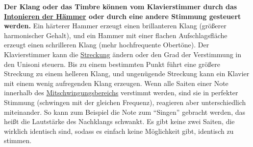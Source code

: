 \textbf{Der Klang oder das Timbre können vom Klavierstimmer durch das \hyperref[c2_7_hamm]{Intonieren der Hämmer} oder durch eine andere Stimmung gesteuert werden.}
Ein härterer Hammer erzeugt einen brillanteren Klang (größerer harmonischer Gehalt), und ein Hammer mit einer flachen  Aufschlagsfläche erzeugt einen schrilleren Klang (mehr hochfrequente Obertöne).
Der Klavierstimmer kann die \hyperref[c2_5_stre]{Streckung} ändern oder den Grad der Verstimmung in den Unisoni steuern.
Bis zu einem bestimmten Punkt führt eine größere Streckung zu einem helleren Klang, und ungenügende Streckung kann ein Klavier mit einem wenig aufregenden Klang erzeugen.
Wenn alle Saiten einer Note innerhalb des \hyperref[c2_5_mits]{Mitschwingungsbereichs} verstimmt werden, sind sie in perfekter Stimmung (schwingen mit der gleichen Frequenz), reagieren aber unterschiedlich miteinander.
So kann zum Beispiel die Note zum \enquote{Singen} gebracht werden, das heißt die Lautstärke des Nachklangs schwankt.
Es gibt keine zwei Saiten, die wirklich identisch sind, sodass es einfach keine Möglichkeit gibt, identisch zu stimmen.

